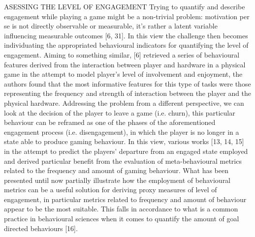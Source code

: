 ASESSING THE LEVEL OF ENGAGEMENT 
Trying to quantify and describe engagement while playing a game might be a non-trivial problem: motivation per se is not directly observable or measurable, it’s rather a latent variable influencing measurable outcomes [6, 31]. In this view the challenge then becomes individuating the appropriated behavioural indicators for quantifying the level of engagement. Aiming to something similar, [6] retrieved a series of behavioural features derived from the interaction between player and hardware in a physical game in the attempt to model player’s level of involvement and enjoyment, the authors found that the most informative features for this type of tasks were those representing the frequency and strength of interaction between the player and the physical hardware. Addressing the problem from a different perspective, we can look at the decision of the player to leave a game (i.e. churn), this particular behaviour can be reframed as one of the phases of the aforementioned engagement process (i.e. disengagement), in which the player is no longer in a state able to produce gaming behaviour. In this view, various works [13, 14, 15] in the attempt to predict the players’ departure from an engaged state employed and derived particular benefit from the evaluation of meta-behavioural metrics related to the frequency and amount of gaming behaviour. What has been presented until now partially illustrate how the employment of behavioural metrics can be a useful solution for deriving proxy measures of level of engagement, in particular metrics related to frequency and amount of behaviour appear to be the most suitable. This falls in accordance to what is a common practice in behavioural sciences when it comes to quantify the amount of goal directed behaviours [16].

